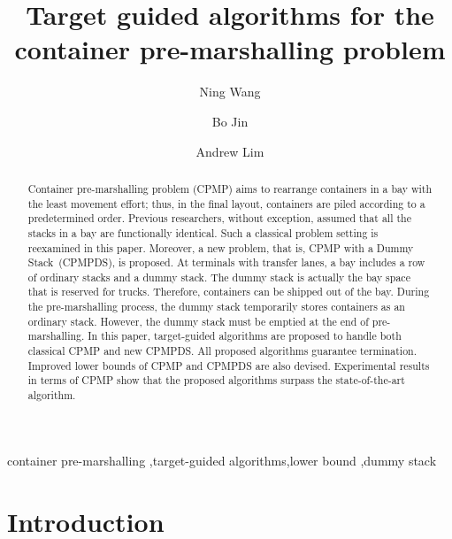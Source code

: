 \documentclass[review,3p,times,authoryear,12pt]{elsarticle}
\begin{document}
\graphicspath{{./figure/}}
\begin{frontmatter}
\newpage

\title{Target guided algorithms for the container pre-marshalling problem}

\author{Ning Wang}

\author{Bo Jin}

\author{Andrew Lim}

\address{
Department of Management Sciences, City University of Hong Kong, 83 Tat Chee Ave, Kowloon Tong, Hong Kong
}

\begin{abstract}
Container pre-marshalling problem (CPMP) aims to rearrange containers in a bay with the least movement effort; thus, in the final layout, containers are piled according to a predetermined order. Previous researchers, without exception, assumed that all the stacks in a bay are functionally identical. Such a classical problem setting is reexamined in this paper. Moreover, a new problem, that is, CPMP with a Dummy Stack~(CPMPDS), is proposed.
At terminals with transfer lanes, a bay includes a row of ordinary stacks and a dummy stack. The dummy stack is actually the bay space that is reserved for trucks. Therefore, containers can be shipped out of the bay. During the pre-marshalling process, the dummy stack temporarily stores containers as an ordinary stack.
However, the dummy stack must be emptied at the end of pre-marshalling. In this paper, target-guided algorithms are proposed to handle both classical CPMP and new CPMPDS. All proposed algorithms guarantee termination. Improved lower bounds of CPMP and CPMPDS are also devised. Experimental results in terms of CPMP show that the proposed algorithms surpass the state-of-the-art algorithm.
\end{abstract}

\begin{keyword}
container pre-marshalling \sep target-guided algorithms\sep lower bound \sep dummy stack
\end{keyword}
\end{frontmatter}

\section{Introduction}
\end{document}
